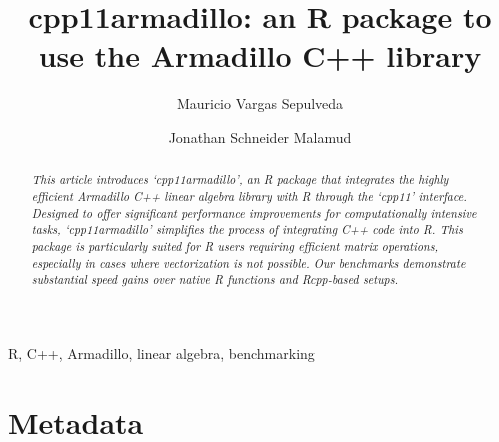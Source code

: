 \documentclass[preprint,12pt, a4paper]{elsarticle}
\begin{document}
\begin{frontmatter}
\title{cpp11armadillo: an R package to use the Armadillo C++ library}


\author[label1]{Mauricio Vargas Sepulveda}
\author[label2]{Jonathan Schneider Malamud}
\address[label1]{University of Toronto, Munk School of Global Affairs
and Public Policy and Department of Political
Science, m.sepulveda@mail.utoronto.ca}
\address[label2]{University of Toronto, Department of Electrical and
Computer Engineering}

\begin{abstract}
\textit{This article introduces `cpp11armadillo', an R package that
integrates the highly efficient Armadillo C++ linear algebra library
with R through the `cpp11' interface. Designed to offer significant
performance improvements for computationally intensive tasks,
`cpp11armadillo' simplifies the process of integrating C++ code into R.
This package is particularly suited for R users requiring efficient
matrix operations, especially in cases where vectorization is not
possible. Our benchmarks demonstrate substantial speed gains over native
R functions and Rcpp-based setups.}
\end{abstract}

\begin{keyword}
R, C++, Armadillo, linear algebra, benchmarking



\end{keyword}

\end{frontmatter}


\section*{Metadata}
\label{}
\end{document}
